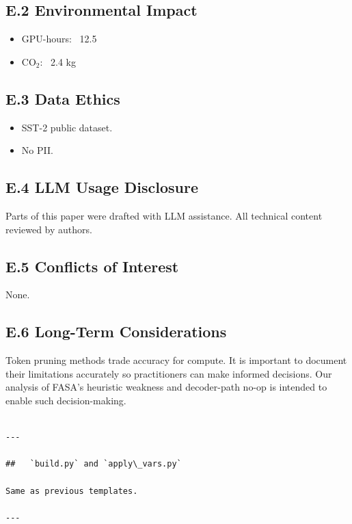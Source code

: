 \subsection{E.2 Environmental Impact}

\begin{itemize}
\item GPU-hours: ~12.5
\item CO$_2$: ~2.4 kg

\end{itemize}
\subsection{E.3 Data Ethics}

\begin{itemize}
\item SST-2 public dataset.
\item No PII.

\end{itemize}
\subsection{E.4 LLM Usage Disclosure}

Parts of this paper were drafted with LLM assistance. All technical content 
reviewed by authors.

\subsection{E.5 Conflicts of Interest}

None.

\subsection{E.6 Long-Term Considerations}

Token pruning methods trade accuracy for compute. It is important to 
document their limitations accurately so practitioners can make informed 
decisions. Our analysis of FASA's heuristic weakness and decoder-path 
no-op is intended to enable such decision-making.
\begin{lstlisting}

---

##   `build.py` and `apply\_vars.py`

Same as previous templates.

---
\end{lstlisting}

